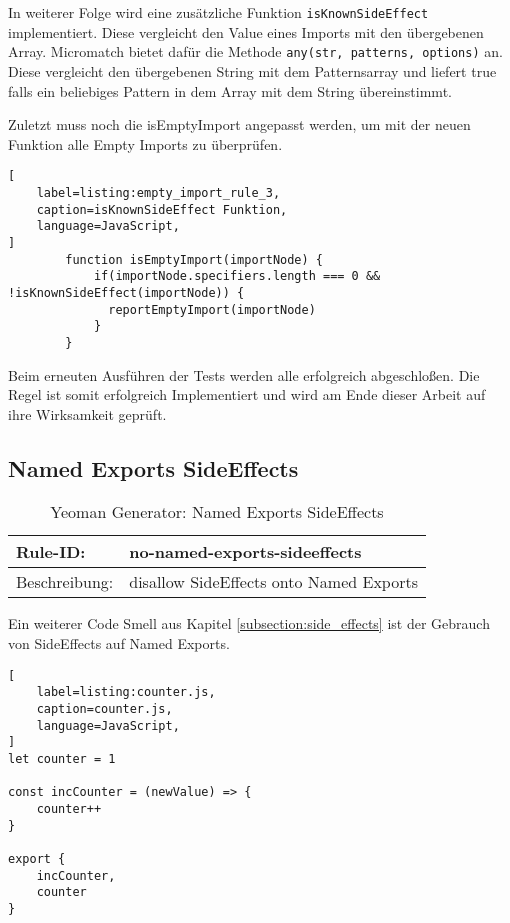 In weiterer Folge wird eine zusätzliche Funktion \lstinline{isKnownSideEffect} implementiert. Diese vergleicht den Value eines Imports mit den übergebenen Array. Micromatch bietet dafür die Methode \lstinline{any(str, patterns, options)} an. Diese vergleicht den übergebenen String mit dem Patternsarray und liefert true falls ein beliebiges Pattern in dem Array mit dem String übereinstimmt.

Zuletzt muss noch die isEmptyImport angepasst werden, um mit der neuen Funktion alle Empty Imports zu überprüfen.

\begin{lstlisting}[
    label=listing:empty_import_rule_3,
	caption=isKnownSideEffect Funktion,
	language=JavaScript,
]
        function isEmptyImport(importNode) {
            if(importNode.specifiers.length === 0 && !isKnownSideEffect(importNode)) {
              reportEmptyImport(importNode)
            }
        }
\end{lstlisting}

Beim erneuten Ausführen der Tests werden alle erfolgreich abgeschloßen. Die Regel ist somit erfolgreich Implementiert und wird am Ende dieser Arbeit auf ihre Wirksamkeit geprüft.

\subsection{Named Exports SideEffects}

\begin{table}[H]
\centering
\caption{Yeoman Generator: Named Exports SideEffects}
\label{tbl:empty_imports}
\begin{tabular}{|l|l|}
\hline
Rule-ID: & no-named-exports-sideeffects \\ \hline
Beschreibung: & disallow SideEffects onto Named Exports \\ \hline
\end{tabular}
\end{table}

Ein weiterer Code Smell aus Kapitel \ref{subsection:side_effects} ist der Gebrauch von SideEffects auf Named Exports.

\begin{lstlisting}[
    label=listing:counter.js,
	caption=counter.js,
	language=JavaScript,
]
let counter = 1

const incCounter = (newValue) => {
	counter++
}

export {
	incCounter,
	counter
}
\end{lstlisting}

